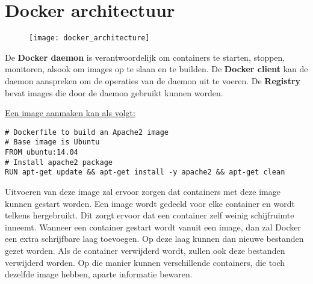	\section{Docker architectuur}
	\begin{figure}[ht]
		\texttt{[image: docker\_architecture]}
	\end{figure}
	De \textbf{Docker daemon} is verantwoordelijk om containers te starten, stoppen, monitoren, alsook om images op te slaan en te builden. De \textbf{Docker client} kan de daemon aanspreken om de operaties van de daemon uit te voeren. De \textbf{Registry} bevat images die door de daemon gebruikt kunnen worden.

	\underline{Een image aanmaken kan als volgt:}
	\begin{lstlisting}
# Dockerfile to build an Apache2 image
# Base image is Ubuntu
FROM ubuntu:14.04
# Install apache2 package
RUN apt-get update && apt-get install -y apache2 && apt-get clean
	\end{lstlisting}
	Uitvoeren van deze image zal ervoor zorgen dat containers met deze image kunnen gestart worden. Een image wordt gedeeld voor elke container en wordt telkens hergebruikt. Dit zorgt ervoor dat een container zelf weinig schijfruimte inneemt. Wanneer een container gestart wordt vanuit een image, dan zal Docker een extra schrijfbare laag toevoegen. Op deze laag kunnen dan nieuwe bestanden gezet worden. Als de container verwijderd wordt, zullen ook deze bestanden verwijderd worden. Op die manier kunnen verschillende containers, die toch dezelfde image hebben, aparte informatie bewaren. 

